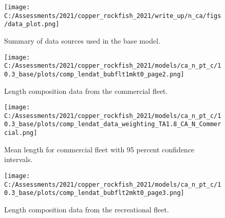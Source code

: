 \documentclass[11pt,
  english,
  a4paper,
]{article}
\begin{document}

\begin{figure}
\centering
\texttt{[image: C:/Assessments/2021/copper\_rockfish\_2021/write\_up/n\_ca/figs/data\_plot.png]}
\caption{Summary of data sources used in the base model.\label{fig:data-plot}}
\end{figure}

\tagmcend\tagstructend


\begin{figure}
\centering
\texttt{[image: C:/Assessments/2021/copper\_rockfish\_2021/models/ca\_n\_pt\_c/10.3\_base/plots/comp\_lendat\_bubflt1mkt0\_page2.png]}
\caption{Length composition data from the commercial fleet.\label{fig:com-len-data}}
\end{figure}

\tagmcend\tagstructend


\begin{figure}
\centering
\texttt{[image: C:/Assessments/2021/copper\_rockfish\_2021/models/ca\_n\_pt\_c/10.3\_base/plots/comp\_lendat\_data\_weighting\_TA1.8\_CA\_N\_Commercial.png]}
\caption{Mean length for commercial fleet with 95 percent confidence intervals.\label{fig:mean-com-len-data}}
\end{figure}

\tagmcend\tagstructend


\begin{figure}
\centering
\texttt{[image: C:/Assessments/2021/copper\_rockfish\_2021/models/ca\_n\_pt\_c/10.3\_base/plots/comp\_lendat\_bubflt2mkt0\_page3.png]}
\caption{Length composition data from the recreational fleet.\label{fig:rec-len-data}}
\end{figure}

\tagmcend\tagstructend

\end{document}
